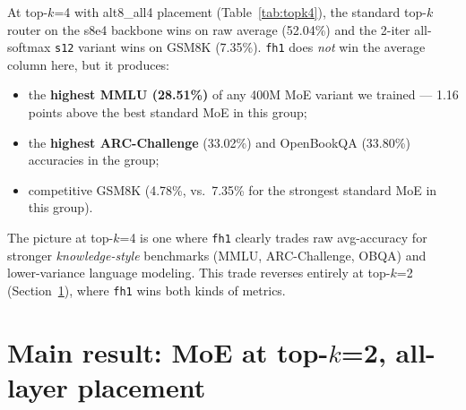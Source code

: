 \documentclass[oneside]{article}
\begin{document}
At top-$k$=4 with alt8\_all4 placement (Table~\ref{tab:topk4}), the standard top-$k$ router on the s8e4 backbone wins on raw average (52.04\%) and the 2-iter all-softmax \texttt{s12} variant wins on GSM8K (7.35\%). \texttt{fh1} does \emph{not} win the average column here, but it produces:
\begin{itemize}[leftmargin=1.5em]
  \item the \textbf{highest MMLU (28.51\%)} of any 400M MoE variant we trained --- 1.16 points above the best standard MoE in this group;
  \item the \textbf{highest ARC-Challenge} (33.02\%) and OpenBookQA (33.80\%) accuracies in the group;
  \item competitive GSM8K (4.78\%, vs.\ 7.35\% for the strongest standard MoE in this group).
\end{itemize}
The picture at top-$k$=4 is one where \texttt{fh1} clearly trades raw avg-accuracy for stronger \emph{knowledge-style} benchmarks (MMLU, ARC-Challenge, OBQA) and lower-variance language modeling. This trade reverses entirely at top-$k$=2 (Section~\ref{sec:topk2}), where \texttt{fh1} wins both kinds of metrics.


\section{Main result: MoE at top-$k$=2, all-layer placement}
\label{sec:topk2}
\end{document}
